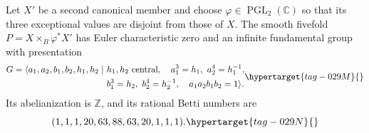 \begin{theorem}\hypertarget{tag-02MN}{}\label{maps:src:E.2.3}


Let $X'$ be a second canonical member and choose $\varphi\in
\operatorname{PGL}_2(\mathbb C)$ so that its three exceptional
values are disjoint from those of $X$.  The smooth fivefold
$P=X\times_B\varphi^*X'$ has Euler characteristic zero and
an infinite fundamental group with presentation
\begin{equation}
\begin{split}
G=\langle a_1,a_2,b_1,b_2,h_1,h_2\mid\ &
 h_1,h_2\ \text{central},\quad
 a_1^3=h_1,\ a_2^4=h_1^{-1},\\
 &b_1^3=h_2,\ b_2^4=h_2^{-1},\quad
 a_1a_2b_1b_2=1\rangle .
\end{split}
\hypertarget{tag-029M}{}\label{maps:eq:E.16}
\end{equation}
Its abelianization is $\mathbb Z$, and its rational Betti numbers are
\begin{equation}
 (1,1,1,20,63,88,63,20,1,1,1).
 \hypertarget{tag-029N}{}\label{maps:eq:E.17}
\end{equation}


\end{theorem}



